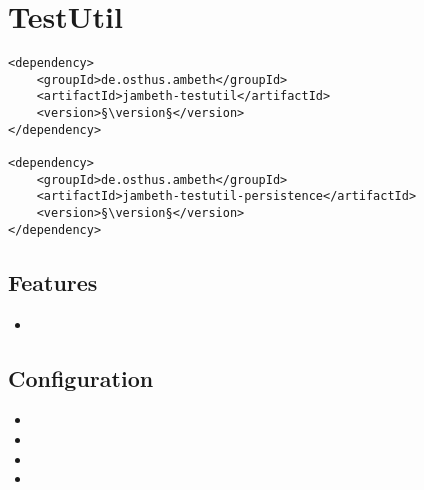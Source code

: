 \section{TestUtil}
\label{module:TestUtil}
\ClearAPI
\TODO
\begin{lstlisting}[style=POM,caption={Maven modules to use \emph{Ambeth TestUtil}}]
<dependency>
	<groupId>de.osthus.ambeth</groupId>
	<artifactId>jambeth-testutil</artifactId>
	<version>§\version§</version>
</dependency>

<dependency>
	<groupId>de.osthus.ambeth</groupId>
	<artifactId>jambeth-testutil-persistence</artifactId>
	<version>§\version§</version>
</dependency>
\end{lstlisting}
\subsection{Features}
\begin{itemize}
	\item \TODO
\end{itemize}

\subsection{Configuration}
\begin{itemize}
	\item {}
	\item {}
	\item {}
	\item {}
\end{itemize}
